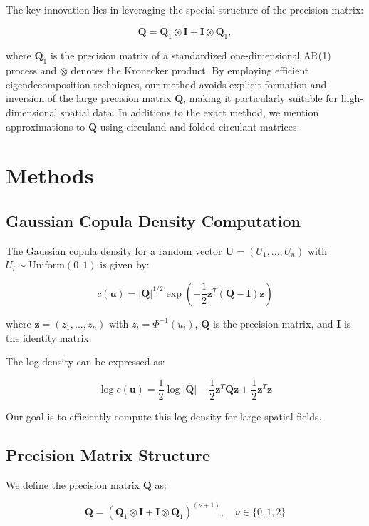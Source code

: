 \documentclass[journal=,manuscript=]{achemso}
\begin{document}
The key innovation lies in leveraging the special structure of the
precision matrix:

\[
\mathbf{Q} = \mathbf{Q}_1 \otimes \mathbf{I} + \mathbf{I} \otimes \mathbf{Q}_1,
\]

where \(\mathbf{Q}_1\) is the precision matrix of a standardized
one-dimensional AR(1) process and \(\otimes\) denotes the Kronecker
product. By employing efficient eigendecomposition techniques, our
method avoids explicit formation and inversion of the large precision
matrix \(\mathbf{Q}\), making it particularly suitable for
high-dimensional spatial data. In additions to the exact method, we
mention approximations to \(\mathbf{Q}\) using circuland and folded
circulant matrices.

\section{Methods}\label{methods}

\subsection{Gaussian Copula Density
Computation}\label{gaussian-copula-density-computation}

The Gaussian copula density for a random vector
\(\mathbf{U} = (U_1, ..., U_n)\) with \(U_i \sim \text{Uniform}(0,1)\)
is given by:

\[
c(\mathbf{u}) = |\mathbf{Q}|^{1/2} \exp\left(-\frac{1}{2}\mathbf{z}^T(\mathbf{Q} - \mathbf{I})\mathbf{z}\right)
\]

where \(\mathbf{z} = (z_1, ..., z_n)\) with \(z_i = \Phi^{-1}(u_i)\),
\(\mathbf{Q}\) is the precision matrix, and \(\mathbf{I}\) is the
identity matrix.

The log-density can be expressed as:

\[
\log c(\mathbf{u}) = \frac{1}{2}\log|\mathbf{Q}| - \frac{1}{2}\mathbf{z}^T\mathbf{Q}\mathbf{z} + \frac{1}{2}\mathbf{z}^T\mathbf{z}
\]

Our goal is to efficiently compute this log-density for large spatial
fields.

\subsection{Precision Matrix
Structure}\label{precision-matrix-structure}

We define the precision matrix \(\mathbf{Q}\) as:

\[
\mathbf{Q} = (\mathbf{Q}_1 \otimes \mathbf{I} + \mathbf{I} \otimes \mathbf{Q}_1)^{(\nu + 1)}, \quad \nu \in \{0, 1, 2\}
\]
\end{document}
